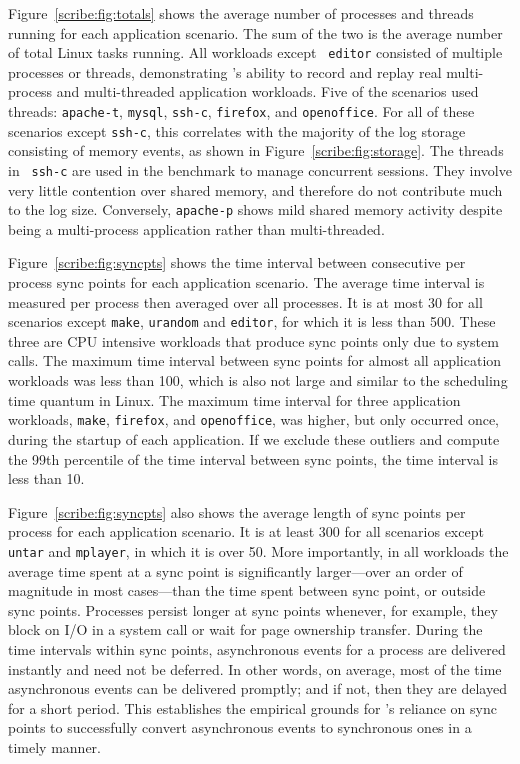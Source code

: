 \begin{table}[]
Figure~\ref{scribe:fig:totals} shows the average number of processes and
threads running for each application scenario.  The sum of the two is
the average number of total Linux tasks running.  All workloads except {\tt
  editor} consisted of multiple processes or threads, demonstrating
\scribe{}'s ability to record and replay real multi-process and
multi-threaded application workloads.  Five of the scenarios used
threads: {\tt apache-t}, {\tt mysql}, {\tt ssh-c}, {\tt firefox}, and 
{\tt openoffice}. For all of these scenarios except {\tt ssh-c}, this
correlates with the majority of the log storage consisting of memory
events, as shown in Figure~\ref{scribe:fig:storage}.  The threads in {\tt
  ssh-c} are
used in the benchmark to manage
concurrent sessions.  They involve very little contention over shared
memory, and therefore do not contribute much to the log size.
Conversely, {\tt apache-p} shows mild shared memory activity despite
being a multi-process application rather than multi-threaded. 

Figure~\ref{scribe:fig:syncpts} shows the time interval between consecutive
per process sync points for each application scenario. The average
time interval is measured per process then averaged over all
processes.  It is at most 30\us{} for all scenarios except {\tt make},
{\tt urandom} and {\tt editor}, for which it is less than 500\us{}.
These three are CPU intensive workloads that produce sync points only
due to system calls.
The maximum time interval between sync points for almost all
application workloads was less than 100\ms{}, which is also not large
and similar to the scheduling time quantum in Linux.  The maximum time
interval for three application workloads, {\tt make}, {\tt firefox},
and {\tt openoffice}, was higher, but only occurred once,
during the startup of each application.  If we exclude these outliers
and compute the 99th percentile of the time interval between sync
points, the time interval is less than 10\ms{}.

Figure~\ref{scribe:fig:syncpts} also shows the average length of sync points
per process for each application scenario. It is at least 300\us{} for
all scenarios except {\tt untar} and {\tt mplayer}, in which it is
over 50\us{}. More importantly, in all workloads the average time
spent at a sync point is significantly larger---over an order of
magnitude in most cases---than the time spent between sync point, or
outside sync points. Processes persist longer at sync points whenever,
for example, they block on I/O in a system call or wait for page
ownership transfer. During the time intervals within sync points,
asynchronous events for a process are delivered instantly and need not
be deferred. In other words, on average, most of the time asynchronous
events can be delivered promptly; and if not, then they are delayed
for a short period.  This establishes the empirical grounds for
\scribe{}'s reliance on sync points to successfully convert
asynchronous events to synchronous ones in a timely manner.


\end{table}
